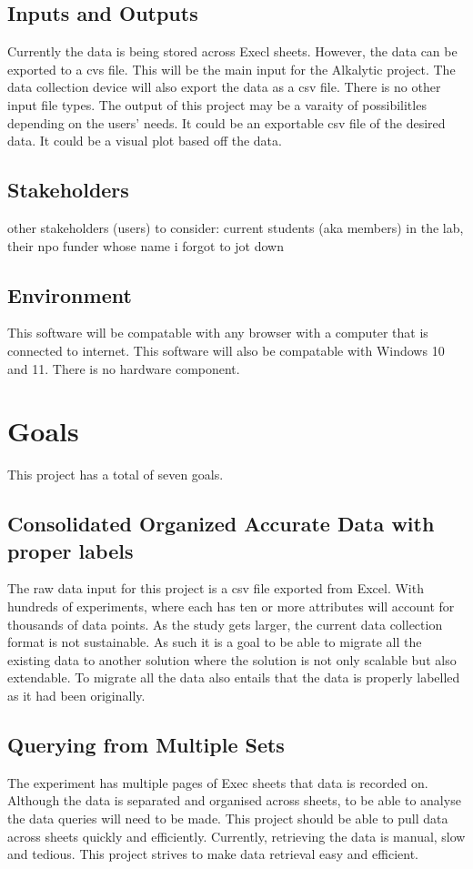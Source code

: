 \documentclass{article}
\begin{document}
\subsection{Inputs and Outputs}
Currently the data is being stored across Execl sheets. However, the data can be exported to a cvs file. This will be the main input for the Alkalytic project. 
The data collection device will also export the data as a csv file. There is no other input file types. 
\newline 
The output of this project may be a varaity of possibilitles depending on the users' needs. It could be an exportable csv file of the desired data. 
It could be a visual plot based off the data.  

\subsection{Stakeholders}
other stakeholders (users) to consider: current students (aka members) in the lab, their npo funder whose name i forgot to jot down

\subsection{Environment}
This software will be compatable with any browser with a computer that is connected to internet. 
This software will also be compatable with Windows 10 and 11. There is no hardware component. 

\section{Goals}
This project has a total of seven goals.
\subsection*{Consolidated Organized Accurate Data with proper labels}
The raw data input for this project is a csv file exported from Excel. With hundreds of experiments,
where each has ten or more attributes will account for thousands of data points. As the study gets larger, the current data collection format is not sustainable.
As such it is a goal to be able to migrate all the existing data to another solution where the solution is not only scalable but also extendable.
To migrate all the data also entails that the data is properly labelled as it had been originally.


\subsection*{Querying from Multiple Sets}
The experiment has multiple pages of Exec sheets that data is recorded on. Although the data is separated and organised across sheets, to be able to analyse the data queries will need to be made.
This project should be able to pull data across sheets quickly and efficiently. Currently, retrieving the data is manual, slow and tedious.
This project strives to make data retrieval easy and efficient.  
\end{document}
